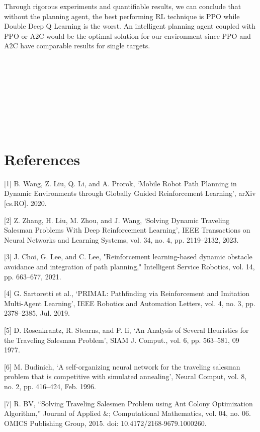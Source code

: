\documentclass{article}
\begin{document}
	Through rigorous experiments and quantifiable results, we can conclude that without the planning agent, the best performing RL technique is PPO while Double Deep Q Learning is the worst. An intelligent planning agent coupled with PPO or A2C would be the optimal solution for our environment since PPO and A2C have comparable results for single targets.
    \\ \\ \\ \\ \\ \\ \\ \\ \\
    
    \section*{References}
	
	[1] B. Wang, Z. Liu, Q. Li, and A. Prorok, ‘Mobile Robot Path Planning in Dynamic Environments through Globally Guided Reinforcement Learning’, arXiv [cs.RO]. 2020.
	
	[2] Z. Zhang, H. Liu, M. Zhou, and J. Wang, ‘Solving Dynamic Traveling Salesman Problems With Deep Reinforcement Learning’, IEEE Transactions on Neural Networks and Learning Systems, vol. 34, no. 4, pp. 2119–2132, 2023.
	
	[3] J. Choi, G. Lee, and C. Lee, "Reinforcement learning-based dynamic obstacle avoidance and integration of path planning," Intelligent Service Robotics, vol. 14, pp. 663–677, 2021. 
		
	[4] G. Sartoretti et al., ‘PRIMAL: Pathfinding via Reinforcement and Imitation Multi-Agent Learning’, IEEE Robotics and Automation Letters, vol. 4, no. 3, pp. 2378–2385, Jul. 2019.
	
	[5] D. Rosenkrantz, R. Stearns, and P. Ii, ‘An Analysis of Several Heuristics for the Traveling Salesman Problem’, SIAM J. Comput., vol. 6, pp. 563–581, 09 1977.
	
	[6] M. Budinich, ‘A self-organizing neural network for the traveling salesman problem that is competitive with simulated annealing’, Neural Comput, vol. 8, no. 2, pp. 416–424, Feb. 1996.
	
	[7] R. BV, “Solving Traveling Salesmen Problem using Ant Colony Optimization Algorithm,” Journal of Applied \&; Computational Mathematics, vol. 04, no. 06. OMICS Publishing Group, 2015. doi: 10.4172/2168-9679.1000260.
\end{document}
